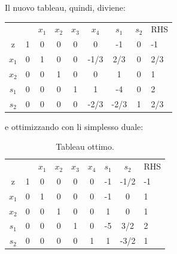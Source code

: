 Il nuovo tableau, quindi, diviene:
\begin{table}[!h]
	\centering
	\begin{tabular}{ccccccccc}
				&       				  & $x_{1}$ & $x_{2}$  & $x_{3}$ & $x_{4}$ & $s_{1}$ & $s_{2}$ &  RHS  \\ \cline{2-9}
		z		& \multicolumn{1}{|l|}{1} & 0       & 0        & 0       & 0       & -1      & 0	   & \multicolumn{1}{|l|}{-1} \\ \cline{2-9}
		$x_{1}$ & \multicolumn{1}{|l|}{0} & 1       & 0        & 0       & -1/3    & 2/3     & 0       & \multicolumn{1}{|l|}{2/3} \\
		$x_{2}$ & \multicolumn{1}{|l|}{0} & 0       & 1        & 0       & 0       & 1       & 0       & \multicolumn{1}{|l|}{1} \\
		$s_{1}$ & \multicolumn{1}{|l|}{0} & 0       & 0        & 1       & 1       & -4      & 0       & \multicolumn{1}{|l|}{2} \\
		$s_{2}$ & \multicolumn{1}{|l|}{0} & 0       & 0        & 0       & -2/3    & -2/3    & 1       & \multicolumn{1}{|l|}{2/3} \\ \cline{2-9}
	\end{tabular}
\end{table}

e ottimizzando con li simplesso duale:
\begin{table}[!h]
	\centering
	\begin{tabular}{ccccccccc}
				&       				  & $x_{1}$ & $x_{2}$  & $x_{3}$ & $x_{4}$ & $s_{1}$ & $s_{2}$ &  RHS  \\ \cline{2-9}
		z		& \multicolumn{1}{|l|}{1} & 0       & 0        & 0       & 0       & -1      & -1/2	   & \multicolumn{1}{|l|}{-1} \\ \cline{2-9}
		$x_{1}$ & \multicolumn{1}{|l|}{0} & 1       & 0        & 0       & 0       & -1      & 0       & \multicolumn{1}{|l|}{1} \\
		$x_{2}$ & \multicolumn{1}{|l|}{0} & 0       & 1        & 0       & 0       & 1       & 0       & \multicolumn{1}{|l|}{1} \\
		$s_{1}$ & \multicolumn{1}{|l|}{0} & 0       & 0        & 1       & 0       & -5      & 3/2     & \multicolumn{1}{|l|}{2} \\
		$s_{2}$ & \multicolumn{1}{|l|}{0} & 0       & 0        & 0       & 1       & 1       & -3/2    & \multicolumn{1}{|l|}{1} \\ \cline{2-9}
	\end{tabular}
	\caption{Tableau ottimo.}
\end{table}

